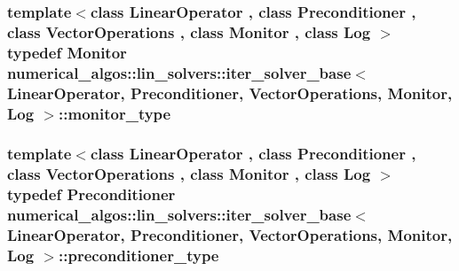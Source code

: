 \hypertarget{classnumerical__algos_1_1lin__solvers_1_1iter__solver__base_a942121df2f8589f8c93aee94e0d23930}{
\subsubsection[{monitor\-\_\-type}]{\setlength{\rightskip}{0pt plus 5cm}template$<$class Linear\-Operator , class Preconditioner , class Vector\-Operations , class Monitor , class Log $>$ typedef Monitor {\bf numerical\-\_\-algos\-::lin\-\_\-solvers\-::iter\-\_\-solver\-\_\-base}$<$ Linear\-Operator, Preconditioner, Vector\-Operations, Monitor, Log $>$\-::{\bf monitor\-\_\-type}}}\label{classnumerical__algos_1_1lin__solvers_1_1iter__solver__base_a942121df2f8589f8c93aee94e0d23930}
\hypertarget{classnumerical__algos_1_1lin__solvers_1_1iter__solver__base_a0746ff1186cb6e8e5648b16065c9cdd2}{
\subsubsection[{preconditioner\-\_\-type}]{\setlength{\rightskip}{0pt plus 5cm}template$<$class Linear\-Operator , class Preconditioner , class Vector\-Operations , class Monitor , class Log $>$ typedef Preconditioner {\bf numerical\-\_\-algos\-::lin\-\_\-solvers\-::iter\-\_\-solver\-\_\-base}$<$ Linear\-Operator, Preconditioner, Vector\-Operations, Monitor, Log $>$\-::{\bf preconditioner\-\_\-type}}}\label{classnumerical__algos_1_1lin__solvers_1_1iter__solver__base_a0746ff1186cb6e8e5648b16065c9cdd2}
